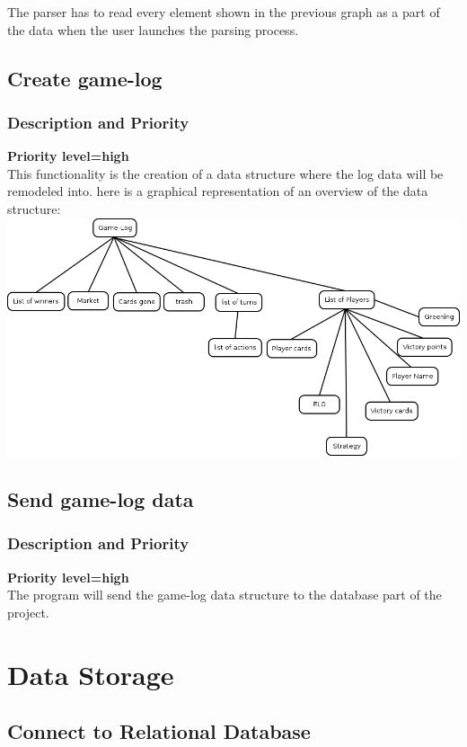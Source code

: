 \documentclass{scrreprt}
\begin{document}
The parser has to read every element shown in the previous graph as a part of the data when the user launches the parsing process.\\


\subsection{Create game-log}
\subsubsection{Description and Priority}
\textbf{Priority level=high}\\
This functionality is the creation of a data structure where the log data will
be remodeled into.
here is a graphical representation of an overview of the data structure:\\
\includegraphics[scale=0.5,keepaspectratio]{game-log}

\subsection{Send game-log data}
\subsubsection{Description and Priority}
\textbf{Priority level=high}\\
The program will send the game-log data structure to the database part of the project.
\section{Data Storage}


\subsection{Connect to Relational Database}
\end{document}

